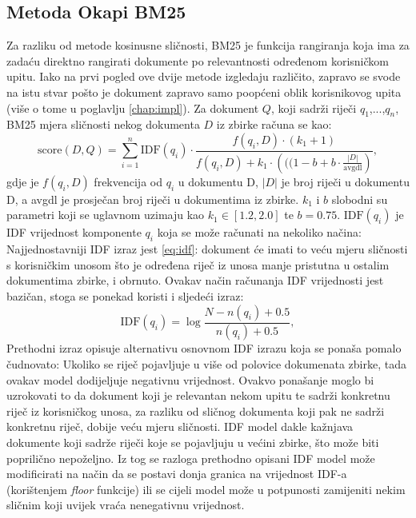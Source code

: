\documentclass[times, utf8, zavrsni]{fer}
\begin{document}
\subsection{Metoda Okapi BM25}
Za razliku od metode kosinusne sličnosti, BM25 je funkcija rangiranja koja ima za zadaću direktno rangirati dokumente po relevantnosti određenom korisničkom upitu. Iako na prvi pogled ove dvije metode izgledaju različito, zapravo se svode na istu stvar pošto je dokument zapravo samo poopćeni oblik korisnikovog upita (više o tome u poglavlju \ref{chap:impl}).
Za dokument $Q$, koji sadrži riječi $q_{1}$,...,$q_{n}$, BM25 mjera sličnosti nekog dokumenta $D$ iz zbirke računa se kao:
\begin{equation}
{\displaystyle {\text{score}}(D,Q)=\sum _{i=1}^{n}{\text{IDF}}(q_{i})\cdot {\frac {f(q_{i},D)\cdot (k_{1}+1)}{f(q_{i},D)+k_{1}\cdot \left(((1-b+b\cdot {\frac {|D|}{\text{avgdl}}}\right)}},}
\end{equation}
gdje je ${\displaystyle f(q_{i},D)}$	 frekvencija od ${\displaystyle q_{i}}$ u dokumentu D, ${\displaystyle |D|}$ je broj riječi u dokumentu D, a avgdl je prosječan broj riječi u dokumentima iz zbirke. ${\displaystyle k_{1}}$ i $b$ slobodni su parametri koji se uglavnom uzimaju kao ${\displaystyle k_{1}\in [1.2,2.0]}$ te ${\displaystyle b=0.75}.{\displaystyle {\text{ IDF}}(q_{i})}$ je IDF vrijednost komponente ${\displaystyle q_{i}}$ koja se može računati na nekoliko načina:
Najjednostavniji IDF izraz jest \ref{eq:idf}: dokument će imati to veću mjeru sličnosti s korisničkim unosom što je određena riječ iz unosa manje pristutna u ostalim dokumentima zbirke, i obrnuto. Ovakav način računanja IDF vrijednosti jest bazičan, stoga se ponekad koristi i sljedeći izraz:
\begin{equation}
\text{IDF}(q_i) = \log \frac{N - n(q_i) + 0.5}{n(q_i) + 0.5},
\label{idf2}
\end{equation}
Prethodni izraz opisuje alternativu osnovnom IDF izrazu koja se ponaša pomalo čudnovato: Ukoliko se riječ pojavljuje u više od polovice dokumenata zbirke, tada ovakav model dodijeljuje negativnu vrijednost. Ovakvo ponašanje moglo bi uzrokovati to da dokument koji je relevantan nekom upitu te sadrži konkretnu riječ iz korisničkog unosa, za razliku od sličnog dokumenta koji pak ne sadrži konkretnu riječ, dobije veću mjeru sličnosti. IDF model dakle kažnjava dokumente koji sadrže riječi koje se pojavljuju u većini zbirke, što može biti poprilično nepoželjno. Iz tog se razloga prethodno opisani IDF model može modificirati na način da se postavi donja granica na vrijednost IDF-a (korištenjem \textit{floor} funkcije) ili se cijeli model može u potpunosti zamijeniti nekim sličnim koji uvijek vraća nenegativnu vrijednost.
\end{document}
